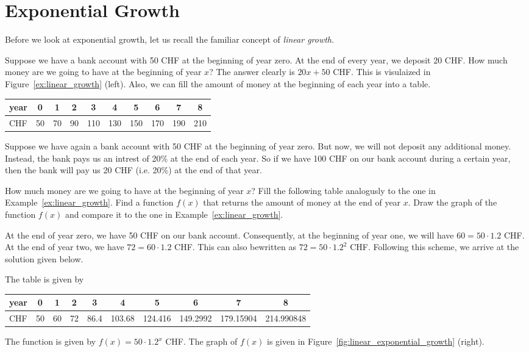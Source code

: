 \section*{Exponential Growth}
Before we look at exponential growth, let us recall the familiar concept of \textit{linear growth}.
\begin{example} \label{ex:linear_growth}
	Suppose we have a bank account with 50 CHF at the beginning of year zero.
	At the end of every year, we deposit 20 CHF.
	How much money are we going to have at the beginning of year $x$?
	The answer clearly is $20x+50$ CHF.
	This is visulaized in Figure~\ref{ex:linear_growth} (left).
	Also, we can fill the amount of money at the beginning of each year into a table.
	\begin{table}[ht]
		\centering
		\begin{tabular}{|l|c|c|c|c|c|c|c|c|c|} \hline
			year & 0 & 1 & 2 & 3 & 4 & 5 & 6 & 7 & 8 \\ \hline
			CHF & 50 & 70 & 90 & 110 & 130 & 150 & 170 & 190 & 210 \\ \hline
		\end{tabular}
		\label{tab:linear_growth}
	\end{table}
\end{example}
\begin{exercise}
	Suppose we have again a bank account with 50 CHF at the beginning of year zero.
	But now, we will not deposit any additional money.
	Instead, the bank pays us an intrest of 20\% at the end of each year.
	So if we have 100 CHF on our bank account during a certain year, then the bank will pay us 20 CHF (i.e. 20\%) at the end of that year.
	\begin{tasks}
		\task How much money are we going to have at the beginning of year $x$? Fill the following table analogusly to the one in Example~\ref{ex:linear_growth}.
		\task Find a function $f\left(x\right)$ that returns the amount of money at the end of year $x$.
		\task Draw the graph of the function $f\left(x\right)$ and compare it to the one in Example~\ref{ex:linear_growth}.
	\end{tasks}
\end{exercise}
\begin{solution*}
	At the end of year zero, we have 50 CHF on our bank account.
	Consequently, at the beginning of year one, we will have $60=50\cdot 1.2$ CHF.
	At the end of year two, we have $72=60\cdot 1.2$ CHF.
	This can also bewritten as $72=50\cdot 1.2^2$ CHF.
	Following this scheme, we arrive at the solution given below.
	\begin{tasks}
		\task The table is given by\\[8pt]
		\begin{tabular}{|l|c|c|c|c|c|c|c|c|c|} \hline
			year & 0 & 1 & 2 & 3 & 4 & 5 & 6 & 7 & 8 \\ \hline
			CHF & 50 & 60 & 72 & 86.4 & 103.68 & 124.416 & 149.2992 & 179.15904 & 214.990848 \\ \hline
		\end{tabular}
		\task The function is given by $f\left(x\right)=50\cdot 1.2^x$ CHF.
		\task The graph of $f\left(x\right)$ is given in Figure~\ref{fig:linear_exponential_growth} (right).
	\end{tasks}
\end{solution*}
